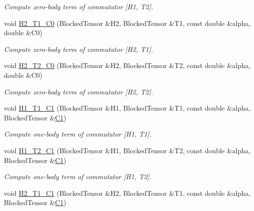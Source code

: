 \begin{DoxyCompactItemize}
\begin{DoxyCompactList}\small\item\em Compute zero-\/body term of commutator \mbox{[}H1, T2\mbox{]}. \end{DoxyCompactList}\item 
void \mbox{\hyperlink{classforte_1_1_m_a_s_t_e_r___d_s_r_g_a10b69298ec5d14c9ad2b8f2412071be4}{H2\+\_\+\+T1\+\_\+\+C0}} (Blocked\+Tensor \&H2, Blocked\+Tensor \&T1, const double \&alpha, double \&C0)
\begin{DoxyCompactList}\small\item\em Compute zero-\/body term of commutator \mbox{[}H2, T1\mbox{]}. \end{DoxyCompactList}\item 
void \mbox{\hyperlink{classforte_1_1_m_a_s_t_e_r___d_s_r_g_a67dd5c7dccc966016949c347e1e87643}{H2\+\_\+\+T2\+\_\+\+C0}} (Blocked\+Tensor \&H2, Blocked\+Tensor \&T2, const double \&alpha, double \&C0)
\begin{DoxyCompactList}\small\item\em Compute zero-\/body term of commutator \mbox{[}H2, T2\mbox{]}. \end{DoxyCompactList}\item 
void \mbox{\hyperlink{classforte_1_1_m_a_s_t_e_r___d_s_r_g_a92d17334220a1ec7d2572322549c780c}{H1\+\_\+\+T1\+\_\+\+C1}} (Blocked\+Tensor \&H1, Blocked\+Tensor \&T1, const double \&alpha, Blocked\+Tensor \&\mbox{\hyperlink{namespaceforte_abe00ec86d0015c0f2b6ac298c6e428e4a1a2ddc2db4693cfd16d534cde5572cc1}{C1}})
\begin{DoxyCompactList}\small\item\em Compute one-\/body term of commutator \mbox{[}H1, T1\mbox{]}. \end{DoxyCompactList}\item 
void \mbox{\hyperlink{classforte_1_1_m_a_s_t_e_r___d_s_r_g_ac5b45c4abfa928d4d2b425f217e5e72e}{H1\+\_\+\+T2\+\_\+\+C1}} (Blocked\+Tensor \&H1, Blocked\+Tensor \&T2, const double \&alpha, Blocked\+Tensor \&\mbox{\hyperlink{namespaceforte_abe00ec86d0015c0f2b6ac298c6e428e4a1a2ddc2db4693cfd16d534cde5572cc1}{C1}})
\begin{DoxyCompactList}\small\item\em Compute one-\/body term of commutator \mbox{[}H1, T2\mbox{]}. \end{DoxyCompactList}\item 
void \mbox{\hyperlink{classforte_1_1_m_a_s_t_e_r___d_s_r_g_a10484c21cfa5e26d83fc0928fb050389}{H2\+\_\+\+T1\+\_\+\+C1}} (Blocked\+Tensor \&H2, Blocked\+Tensor \&T1, const double \&alpha, Blocked\+Tensor \&\mbox{\hyperlink{namespaceforte_abe00ec86d0015c0f2b6ac298c6e428e4a1a2ddc2db4693cfd16d534cde5572cc1}{C1}})

\end{DoxyCompactItemize}
